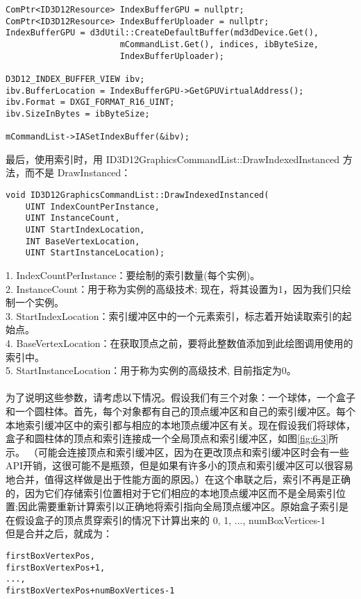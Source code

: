 \begin{flushleft}
\begin{lstlisting}
ComPtr<ID3D12Resource> IndexBufferGPU = nullptr;
ComPtr<ID3D12Resource> IndexBufferUploader = nullptr;
IndexBufferGPU = d3dUtil::CreateDefaultBuffer(md3dDevice.Get(), 
                       mCommandList.Get(), indices, ibByteSize, 
                       IndexBufferUploader);

D3D12_INDEX_BUFFER_VIEW ibv;
ibv.BufferLocation = IndexBufferGPU->GetGPUVirtualAddress();
ibv.Format = DXGI_FORMAT_R16_UINT;
ibv.SizeInBytes = ibByteSize;

mCommandList->IASetIndexBuffer(&ibv);
\end{lstlisting}
最后，使用索引时，用 ID3D12GraphicsCommandList::DrawIndexedInstanced 方法，而不是 DrawInstanced：\\
\begin{lstlisting}
void ID3D12GraphicsCommandList::DrawIndexedInstanced(
    UINT IndexCountPerInstance,
    UINT InstanceCount,
    UINT StartIndexLocation,
    INT BaseVertexLocation,
    UINT StartInstanceLocation);
\end{lstlisting}
1. IndexCountPerInstance：要绘制的索引数量(每个实例)。\\
2. InstanceCount：用于称为实例的高级技术; 现在，将其设置为1，因为我们只绘制一个实例。\\
3. StartIndexLocation：索引缓冲区中的一个元素索引，标志着开始读取索引的起始点。\\
4. BaseVertexLocation：在获取顶点之前，要将此整数值添加到此绘图调用使用的索引中。\\
5. StartInstanceLocation：用于称为实例的高级技术, 目前指定为0。\\
~\\
为了说明这些参数，请考虑以下情况。假设我们有三个对象：一个球体，一个盒子和一个圆柱体。首先，每个对象都有自己的顶点缓冲区和自己的索引缓冲区。每个本地索引缓冲区中的索引都与相应的本地顶点缓冲区有关。现在假设我们将球体，盒子和圆柱体的顶点和索引连接成一个全局顶点和索引缓冲区，如图\ref{fig:6-3}所示。 （可能会连接顶点和索引缓冲区，因为在更改顶点和索引缓冲区时会有一些API开销，这很可能不是瓶颈，但是如果有许多小的顶点和索引缓冲区可以很容易地合并，值得这样做是出于性能方面的原因。）在这个串联之后，索引不再是正确的，因为它们存储索引位置相对于它们相应的本地顶点缓冲区而不是全局索引位置;因此需要重新计算索引以正确地将索引指向全局顶点缓冲区。原始盒子索引是在假设盒子的顶点贯穿索引的情况下计算出来的 0, 1, ..., numBoxVertices-1\\
但是合并之后，就成为：\\
\begin{lstlisting}
firstBoxVertexPos,
firstBoxVertexPos+1,
...,
firstBoxVertexPos+numBoxVertices-1
\end{lstlisting}
 

\end{flushleft}
